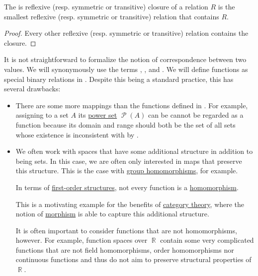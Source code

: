 \begin{proposition}\label{thm:derived_relations_characterization}
  The is reflexive (resp. symmetric or transitive) closure of a relation \( R \) is the smallest reflexive (resp. symmetric or transitive) relation that contains \( R \).
\end{proposition}
\begin{proof}
  Every other reflexive (resp. symmetric or transitive) relation contains the closure.
\end{proof}

\begin{remark}\label{rem:function_definition}
  It is not straightforward to formalize the notion of correspondence between two values. We will synonymously use the terms , ,  and . We will define functions as special binary relations in . Despite this being a standard practice, this has several drawbacks:

  \begin{itemize}
    \item There are some more mappings than the functions defined in . For example, assigning to a set \( A \) its \hyperref[def:basic_set_operations/power_set]{power set} \( \mscrP(A) \) can be cannot be regarded as a function because its domain and range should both be the set of all sets whose existence is inconsistent with \hyperref[def:zfc]{} by .

    \item We often work with spaces that have some additional structure in addition to being sets. In this case, we are often only interested in maps that preserve this structure. This is the case with \hyperref[def:group/homomorphism]{group homomorphisms}, for example.

    In terms of \hyperref[def:first_order_structure]{first-order structures}, not every function is a \hyperref[def:first_order_homomorphism]{homomorphism}.

    This is a motivating example for the benefits of \hyperref[sec:category_theory]{category theory}, where the notion of \hyperref[def:category/C2]{morphism} is able to capture this additional structure.

    It is often important to consider functions that are not homomorphisms, however. For example, function spaces over \( \BbbR \) contain some very complicated functions that are not field homomorphisms, order homomorphisms nor continuous functions and thus do not aim to preserve structural properties of \( \BbbR \).


\end{itemize}
\end{remark}
